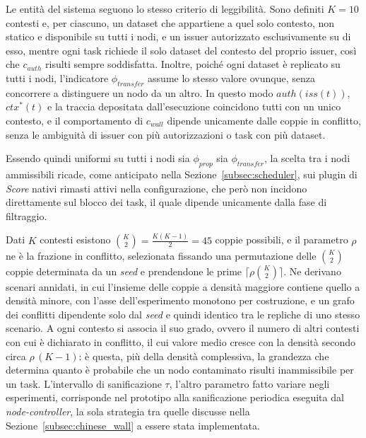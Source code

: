 Le entità del sistema seguono lo stesso criterio di leggibilità. Sono definiti $K = 10$ contesti e, per ciascuno, un dataset che appartiene a quel solo contesto, non statico e disponibile su tutti i nodi, e un issuer autorizzato esclusivamente su di esso, mentre ogni task richiede il solo dataset del contesto del proprio issuer, così che $c_{auth}$ risulti sempre soddisfatta. Inoltre, poiché ogni dataset è replicato su tutti i nodi, l'indicatore $\phi_{transfer}$ assume lo stesso valore ovunque, senza concorrere a distinguere un nodo da un altro. In questo modo $auth(iss(t))$, $ctx^*(t)$ e la traccia depositata dall'esecuzione coincidono tutti con un unico contesto, e il comportamento di $c_{wall}$ dipende unicamente dalle coppie in conflitto, senza le ambiguità di issuer con più autorizzazioni o task con più dataset.

Essendo quindi uniformi su tutti i nodi sia $\phi_{prop}$ sia $\phi_{transfer}$, la scelta tra i nodi ammissibili ricade, come anticipato nella Sezione~\ref{subsec:scheduler}, sui plugin di \emph{Score} nativi rimasti attivi nella configurazione, che però non incidono direttamente sul blocco dei task, il quale dipende unicamente dalla fase di filtraggio.

Dati $K$ contesti esistono $\binom{K}{2} = \frac{K(K-1)}{2} = 45$ coppie possibili, e il parametro $\rho$ ne è la frazione in conflitto, selezionata fissando una permutazione delle $\binom{K}{2}$ coppie determinata da un \emph{seed} e prendendone le prime $\lceil \rho \binom{K}{2} \rceil$. Ne derivano scenari annidati, in cui l'insieme delle coppie a densità maggiore contiene quello a densità minore, con l'asse dell'esperimento monotono per costruzione, e un grafo dei conflitti dipendente solo dal \emph{seed} e quindi identico tra le repliche di uno stesso scenario. A ogni contesto si associa il suo grado, ovvero il numero di altri contesti con cui è dichiarato in conflitto, il cui valore medio cresce con la densità secondo circa $\rho\,(K-1)$: è questa, più della densità complessiva, la grandezza che determina quanto è probabile che un nodo contaminato risulti inammissibile per un task. L'intervallo di sanificazione $\tau$, l'altro parametro fatto variare negli esperimenti, corrisponde nel prototipo alla sanificazione periodica eseguita dal \emph{node-controller}, la sola strategia tra quelle discusse nella Sezione~\ref{subsec:chinese_wall} a essere stata implementata.



